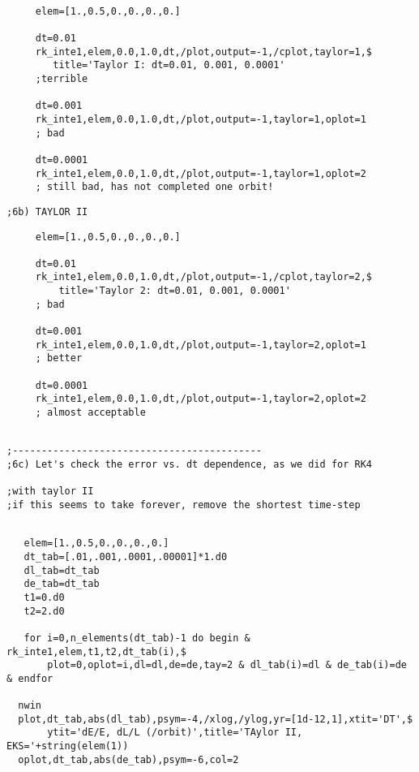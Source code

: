 \documentclass[a4paper,12pt]{article}
\def\red{\color{red}}
\def\black{\color{RGBblack}}
\begin{document}
\red
\begin{verbatim}

     elem=[1.,0.5,0.,0.,0.,0.]

     dt=0.01
     rk_inte1,elem,0.0,1.0,dt,/plot,output=-1,/cplot,taylor=1,$
        title='Taylor I: dt=0.01, 0.001, 0.0001'    
     ;terrible

     dt=0.001
     rk_inte1,elem,0.0,1.0,dt,/plot,output=-1,taylor=1,oplot=1 
     ; bad

     dt=0.0001
     rk_inte1,elem,0.0,1.0,dt,/plot,output=-1,taylor=1,oplot=2 
     ; still bad, has not completed one orbit!

\end{verbatim}
\black
\begin{verbatim}
;6b) TAYLOR II

\end{verbatim}
\red
\begin{verbatim}
     elem=[1.,0.5,0.,0.,0.,0.]

     dt=0.01
     rk_inte1,elem,0.0,1.0,dt,/plot,output=-1,/cplot,taylor=2,$
         title='Taylor 2: dt=0.01, 0.001, 0.0001'    
     ; bad

     dt=0.001
     rk_inte1,elem,0.0,1.0,dt,/plot,output=-1,taylor=2,oplot=1 
     ; better

     dt=0.0001
     rk_inte1,elem,0.0,1.0,dt,/plot,output=-1,taylor=2,oplot=2 
     ; almost acceptable


\end{verbatim}
\black
\begin{verbatim}
;-------------------------------------------
;6c) Let's check the error vs. dt dependence, as we did for RK4

;with taylor II
;if this seems to take forever, remove the shortest time-step

\end{verbatim}
\red
\begin{verbatim}

   elem=[1.,0.5,0.,0.,0.,0.]
   dt_tab=[.01,.001,.0001,.00001]*1.d0
   dl_tab=dt_tab
   de_tab=dt_tab
   t1=0.d0
   t2=2.d0

   for i=0,n_elements(dt_tab)-1 do begin &  rk_inte1,elem,t1,t2,dt_tab(i),$
       plot=0,oplot=i,dl=dl,de=de,tay=2 & dl_tab(i)=dl & de_tab(i)=de & endfor

  nwin
  plot,dt_tab,abs(dl_tab),psym=-4,/xlog,/ylog,yr=[1d-12,1],xtit='DT',$
       ytit='dE/E, dL/L (/orbit)',title='TAylor II, EKS='+string(elem(1))
  oplot,dt_tab,abs(de_tab),psym=-6,col=2


\end{verbatim}
\end{document}
